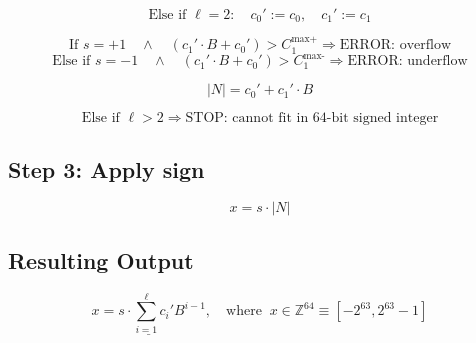 \documentclass[11pt]{article}
\begin{document}
	\[
	\text{Else if } \ell = 2:
	\quad c_0' := c_0,
	\quad c_1' := c_1
	\]
	
	
	\[
	\text{If } s = +1\quad \land \quad (c_1' \cdot B + c_0') > C_1^{\text{max+}} \Rightarrow \text{ERROR: overflow}
	\]
	\[
	\text{Else if } s = -1 \quad \land \quad (c_1' \cdot B + c_0') > C_1^{\text{max-}} \Rightarrow \text{ERROR: underflow}
	\]
	
	
	\[
	|N| = c_0' + c_1' \cdot B
	\]
	
	
	\[
	\text{Else if } \ell > 2 \Rightarrow \text{STOP: cannot fit in 64-bit signed integer}
	\]
	
	
	\subsection*{Step 3: Apply sign}
	\[
	x = s \cdot |N|
	\]
	
	
	\subsection*{Resulting Output}
	\[
	\underline{x = s \cdot \sum_{i=1}^{\ell} c_i' B^{i-1}}, \quad \text{where }\ x \in \mathbb{Z}^{64} \equiv  [-2^{63}, 2^{63} - 1]
	\]
	

	
	
	
\end{document}
